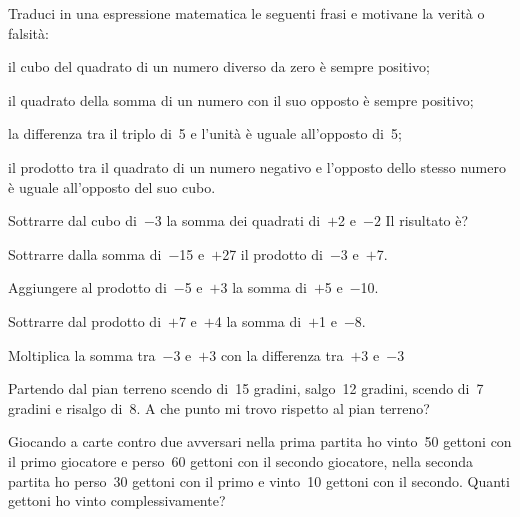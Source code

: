 \begin{htmulticols}{2}
\begin{esercizio}
Traduci in una espressione matematica le seguenti frasi e motivane la 
verità o falsità:
 \begin{enumeratees}
 \item il cubo del quadrato di un numero diverso da zero è sempre positivo;
 \item il quadrato della somma di un numero con il suo opposto è sempre 
positivo;
 \item la differenza tra il triplo di~5 e l'unità è uguale all'opposto di~5;
 \item il prodotto tra il quadrato di un numero negativo e l'opposto dello 
stesso numero 
è uguale all'opposto del suo cubo.
 \end{enumeratees}
\end{esercizio}

\begin{esercizio}
 Sottrarre dal cubo di~\(-3\) la somma dei quadrati di~\(+\)2 e~\(-2\) Il 
risultato è?
\end{esercizio}

\begin{esercizio}
 Sottrarre dalla somma di~\(-\)15 e~\(+\)27 il prodotto di~\(-\)3 e~\(+\)7.
\end{esercizio}

\begin{esercizio}
 Aggiungere al prodotto di~\(-\)5 e~\(+\)3 la somma di~\(+\)5 e~\(-\)10.
\end{esercizio}

\begin{esercizio}
 Sottrarre dal prodotto di~\(+\)7 e~\(+\)4 la somma di~\(+\)1 e~\(-\)8.
\end{esercizio}

\begin{esercizio}
 Moltiplica la somma tra~\(-3\) e~\(+3\) con la differenza tra~\(+3\) e~\(-3\)
\end{esercizio}

\begin{esercizio}
 Partendo dal pian terreno scendo di~15 gradini, salgo~12 gradini, scendo di~7
gradini e risalgo di~8. A che punto mi trovo rispetto al pian terreno?
\end{esercizio}

\begin{esercizio}
 Giocando a carte contro due avversari nella prima partita ho vinto~50 
gettoni 
con il primo giocatore e perso~60
gettoni con il secondo giocatore, nella seconda partita ho perso~30 gettoni 
con 
il primo e vinto~10 gettoni
con il secondo. Quanti gettoni ho vinto complessivamente?
\end{esercizio}


\end{htmulticols}
